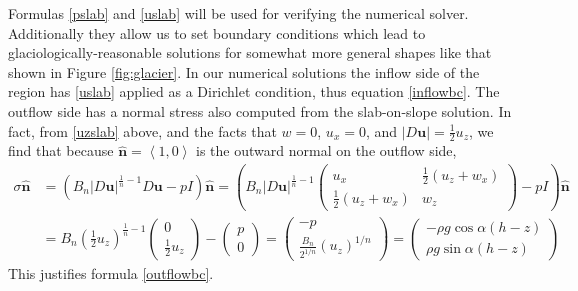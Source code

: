 \documentclass[letterpaper,final,12pt,reqno]{amsart}
\newcommand{\hbn}{\hat{\mathbf{n}}}
\newcommand{\bu}{\mathbf{u}}
\begin{document}
Formulas \eqref{pslab} and \eqref{uslab} will be used for verifying the numerical solver.  Additionally they allow us to set boundary conditions which lead to glaciologically-reasonable solutions for somewhat more general shapes like that shown in Figure \ref{fig:glacier}.  In our numerical solutions the inflow side of the region has \eqref{uslab} applied as a Dirichlet condition, thus equation \eqref{inflowbc}.  The outflow side has a normal stress also computed from the slab-on-slope solution.  In fact, from \eqref{uzslab} above, and the facts that $w=0$, $u_x=0$, and $|D\bu| = \frac{1}{2} u_z$, we find that because $\hbn=\left<1,0\right>$ is the outward normal on the outflow side,
\begin{align*}
\sigma \hbn &= \left(B_n |D\bu|^{\frac{1}{n}-1} D\bu - pI\right)\hbn = \left(B_n |D\bu|^{\frac{1}{n}-1} \begin{pmatrix} u_x & \frac{1}{2}(u_z+w_x) \\ \frac{1}{2}(u_z+w_x) & w_z \end{pmatrix} - pI\right)\hbn \\
    &= B_n \left(\frac{1}{2} u_z\right)^{\frac{1}{n}-1} \begin{pmatrix} 0 \\ \frac{1}{2} u_z \end{pmatrix} - \begin{pmatrix} p \\ 0 \end{pmatrix} = \begin{pmatrix} - p \\ \frac{B_n}{2^{1/n}} (u_z)^{1/n} \end{pmatrix} = \begin{pmatrix} - \rho g\cos\alpha (h-z) \\ \rho g\sin\alpha (h-z) \end{pmatrix}
\end{align*}
This justifies formula \eqref{outflowbc}.
\end{document}
